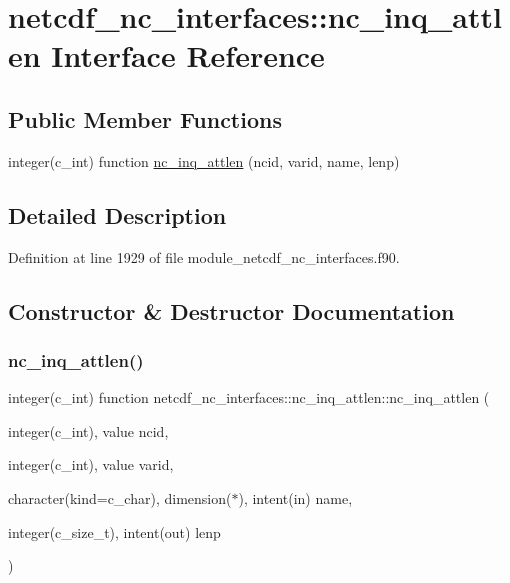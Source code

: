 \hypertarget{interfacenetcdf__nc__interfaces_1_1nc__inq__attlen}{}\section{netcdf\+\_\+nc\+\_\+interfaces\+:\+:nc\+\_\+inq\+\_\+attlen Interface Reference}
\label{interfacenetcdf__nc__interfaces_1_1nc__inq__attlen}
\subsection*{Public Member Functions}
\begin{DoxyCompactItemize}
\item 
integer(c\+\_\+int) function \hyperlink{interfacenetcdf__nc__interfaces_1_1nc__inq__attlen_a9089c02311fdbd44d69d71bf8582069f}{nc\+\_\+inq\+\_\+attlen} (ncid, varid, name, lenp)
\end{DoxyCompactItemize}


\subsection{Detailed Description}


Definition at line 1929 of file module\+\_\+netcdf\+\_\+nc\+\_\+interfaces.\+f90.



\subsection{Constructor \& Destructor Documentation}
\mbox{\label{interfacenetcdf__nc__interfaces_1_1nc__inq__attlen_a9089c02311fdbd44d69d71bf8582069f}} 
\subsubsection{\texorpdfstring{nc\+\_\+inq\+\_\+attlen()}{nc\_inq\_attlen()}}
{\footnotesize\ttfamily integer(c\+\_\+int) function netcdf\+\_\+nc\+\_\+interfaces\+::nc\+\_\+inq\+\_\+attlen\+::nc\+\_\+inq\+\_\+attlen (\begin{DoxyParamCaption}\item[{integer(c\+\_\+int), value}]{ncid,  }\item[{integer(c\+\_\+int), value}]{varid,  }\item[{character(kind=c\+\_\+char), dimension($\ast$), intent(in)}]{name,  }\item[{integer(c\+\_\+size\+\_\+t), intent(out)}]{lenp }\end{DoxyParamCaption})}



